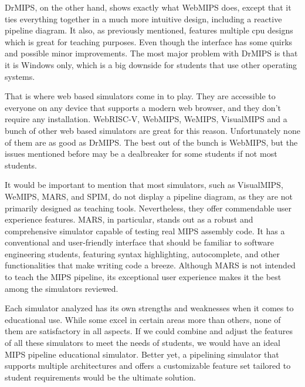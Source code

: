DrMIPS, on the other hand, shows exactly what WebMIPS does, except that it ties everything together in a much more intuitive design, including a reactive pipeline diagram. It also, as previously mentioned, features multiple cpu designs which is great for teaching purposes. Even though the interface has some quirks and possible minor improvements. The most major problem with DrMIPS is that it is Windows only, which is a big downside for students that use other operating systems.

That is where web based simulators come in to play. They are accessible to everyone on any device that supports a modern web browser, and they don't require any installation. WebRISC-V, WebMIPS, WeMIPS, VisualMIPS and a bunch of other web based simulators are great for this reason. Unfortunately none of them are as good as DrMIPS. The best out of the bunch is WebMIPS, but the issues mentioned before may be a dealbreaker for some students if not most students.

It would be important to mention that most simulators, such as VisualMIPS, WeMIPS, MARS, and SPIM, do not display a pipeline diagram, as they are not primarily designed as teaching tools. Nevertheless, they offer commendable user experience features. MARS, in particular, stands out as a robust and comprehensive simulator capable of testing real MIPS assembly code. It has a conventional and user-friendly interface that should be familiar to software engineering students, featuring syntax highlighting, autocomplete, and other functionalities that make writing code a breeze. Although MARS is not intended to teach the MIPS pipeline, its exceptional user experience makes it the best among the simulators reviewed.

Each simulator analyzed has its own strengths and weaknesses when it comes to educational use. While some excel in certain areas more than others, none of them are satisfactory in all aspects. If we could combine and adjust the features of all these simulators to meet the needs of students, we would have an ideal MIPS pipeline educational simulator. Better yet, a pipelining simulator that supports multiple architectures and offers a customizable feature set tailored to student requirements would be the ultimate solution.

